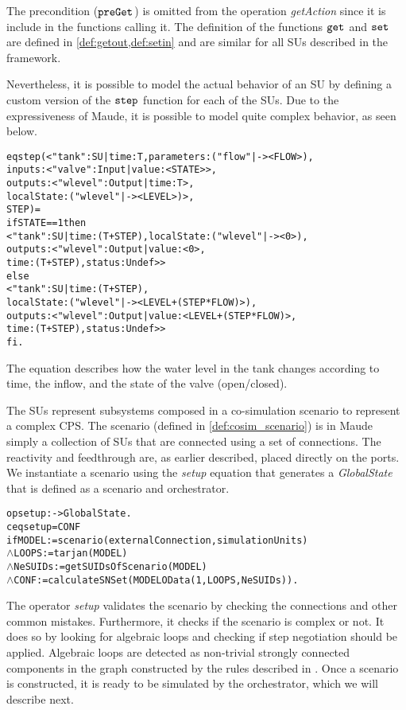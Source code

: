 The precondition ($\mathtt{preGet}_{}$) is omitted from the operation \emph{getAction} since it is include in the functions calling it.
The definition of the functions $\mathtt{get}_{}$ and $\mathtt{set}_{}$ are defined in \cref{def:getout,def:setin} and are similar for all SUs described in the framework.

Nevertheless, it is possible to model the actual behavior of an SU by defining a custom version of the $\mathtt{step}_{}$ function for each of the SUs. 
Due to the expressiveness of Maude, it is possible to model quite complex behavior, as seen below.

\begin{alltt}
  \small
  eq step(< "tank" : SU | time : T, parameters : ("flow" |-> < FLOW >), 
                      inputs : < "valve" : Input | value : < STATE > >, 
                      outputs : < "wlevel" : Output | time : T >,
                      localState : ( "wlevel" |-> < LEVEL > ) >,
                      STEP) = 
  if STATE == 1 then 
      < "tank" : SU | time:(T+STEP), localState : ( "wlevel" |-> < 0 > ),
      outputs : < "wlevel" : Output | value : < 0 >, 
      time : (T + STEP), status : Undef > >
    else 
      < "tank" : SU | time : (T + STEP), 
      localState : ( "wlevel" |-> < LEVEL + (STEP * FLOW) > ), 
      outputs :< "wlevel" : Output|value : < LEVEL + (STEP * FLOW) >, 
      time : (T + STEP), status : Undef > > 
  fi .
\end{alltt}

The equation describes how the water level in the tank changes according to time, the inflow, and the state of the valve (open/closed).

The SUs represent subsystems composed in a co-simulation scenario to represent a complex CPS.
The scenario (defined in \cref{def:cosim_scenario}) is in Maude simply a collection of SUs that are connected using a set of connections.
The reactivity and feedthrough are, as earlier described, placed directly on the ports.
We instantiate a scenario using the \emph{setup} equation that generates a \emph{GlobalState} that is defined as a scenario and orchestrator.
\begin{alltt}
  \small
  op setup : -> GlobalState .
  ceq setup = { CONF }
    if MODEL := scenario(externalConnection, simulationUnits)
    \(\land\) LOOPS := tarjan(MODEL)
    \(\land\) NeSUIDs := getSUIDsOfScenario(MODEL)
    \(\land\) CONF := calculateSNSet(MODEL OData(1,LOOPS, NeSUIDs)) .
\end{alltt}

The operator \emph{setup} validates the scenario by checking the connections and other common mistakes.
Furthermore, it checks if the scenario is complex or not.
It does so by looking for algebraic loops and checking if step negotiation should be applied.
Algebraic loops are detected as non-trivial strongly connected components in the graph constructed by the rules described in \cite{Gomes2019c}. 
Once a scenario is constructed, it is ready to be simulated by the orchestrator, which we will describe next. 

